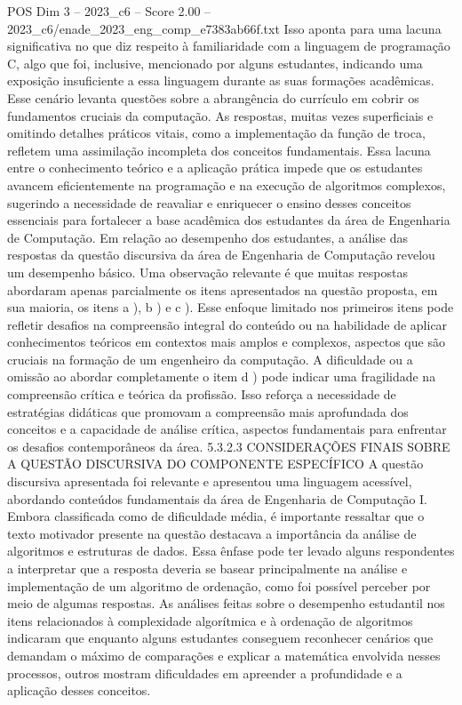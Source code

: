 \begin{textsample}{POS Dim 3 – 2023\_c6 – Score 2.00 – 2023\_c6/enade\_2023\_eng\_comp\_e7383ab66f.txt}
Isso aponta para uma lacuna significativa no que diz respeito à familiaridade com a linguagem de programação C, algo que foi, inclusive, mencionado por alguns estudantes, indicando uma exposição insuficiente a essa linguagem durante as suas formações acadêmicas.
Esse cenário levanta questões sobre a abrangência do currículo em cobrir os fundamentos cruciais da computação.
As respostas, muitas vezes superficiais e omitindo detalhes práticos vitais, como a implementação da função de troca, refletem uma assimilação incompleta dos conceitos fundamentais.
Essa lacuna entre o conhecimento teórico e a aplicação prática impede que os estudantes avancem eficientemente na programação e na execução de algoritmos complexos, sugerindo a necessidade de reavaliar e enriquecer o ensino desses conceitos essenciais para fortalecer a base acadêmica dos estudantes da área de Engenharia de Computação.
Em relação ao desempenho dos estudantes, a análise das respostas da questão discursiva da área de Engenharia de Computação revelou um desempenho básico.
Uma observação relevante é que muitas respostas abordaram apenas parcialmente os itens apresentados na questão proposta, em sua maioria, os itens a ), b ) e c ).
Esse enfoque limitado nos primeiros itens pode refletir desafios na compreensão integral do conteúdo ou na habilidade de aplicar conhecimentos teóricos em contextos mais amplos e complexos, aspectos que são cruciais na formação de um engenheiro da computação.
A dificuldade ou a omissão ao abordar completamente o item d ) pode indicar uma fragilidade na compreensão crítica e teórica da profissão.
Isso reforça a necessidade de estratégias didáticas que promovam a compreensão mais aprofundada dos conceitos e a capacidade de análise crítica, aspectos fundamentais para enfrentar os desafios contemporâneos da área. 5.3.2.3 CONSIDERAÇÕES FINAIS SOBRE A QUESTÃO DISCURSIVA DO COMPONENTE ESPECÍFICO A questão discursiva apresentada foi relevante e apresentou uma linguagem acessível, abordando conteúdos fundamentais da área de Engenharia de Computação I.
Embora classificada como de dificuldade média, é importante ressaltar que o texto motivador presente na questão destacava a importância da análise de algoritmos e estruturas de dados.
Essa ênfase pode ter levado alguns respondentes a interpretar que a resposta deveria se basear principalmente na análise e implementação de um algoritmo de ordenação, como foi possível perceber por meio de algumas respostas.
As análises feitas sobre o desempenho estudantil nos itens relacionados à complexidade algorítmica e à ordenação de algoritmos indicaram que enquanto alguns estudantes conseguem reconhecer cenários que demandam o máximo de comparações e explicar a matemática envolvida nesses processos, outros mostram dificuldades em apreender a profundidade e a aplicação desses conceitos.

\end{textsample}
